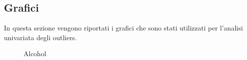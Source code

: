 \newpage

\subsection{Grafici}
In questa sezione vengono riportati i grafici che sono stati utilizzati per l'analisi univariata degli outliers. 

\begin{figure}[H]
    \centering


    \quad

    \label{fig:outliers-alcohol}
    \caption{Alcohol}
\end{figure}


